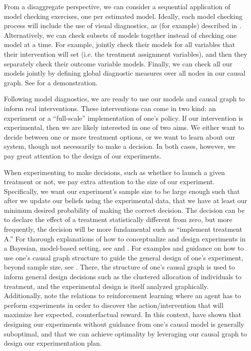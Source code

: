 From a disaggregate perspective, we can consider a sequential application of model checking exercises, one per estimated model.
Ideally, each model checking process will include the use of visual diagnostics, as (for example) described in \citet{brathwaite_2018_check}.
Alternatively, we can check subsets of models together instead of checking one model at a time.
For example, \citet{tran_2016_model} jointly check their models for all variables that their intervention will set (i.e. the treatment assignment variables), and then they separately check their outcome variable models.
Finally, we can check all our models jointly by defining global diagnostic measures over all nodes in our causal graph.
See \citet{williamson_2013_model} for a demonstration.

Following model diagnostics, we are ready to use our models and causal graph to inform real interventions.
These interventions can come in two kind: an experiment or a ``full-scale'' implementation of one's policy.
If our intervention is experimental, then we are likely interested in one of two aims.
We either want to decide between one or more treatment options, or we want to learn about our system, though not necessarily to make a decision.
In both cases, however, we pay great attention to the design of our experiments.

When experimenting to make decisions, such as whether to launch a given treatment or not, we pay extra attention to the size of our experiment.
Specifically, we want our experiment's sample size to be large enough such that after we update our beliefs using the experimental data, that we have at least our minimum desired probability of making the correct decision.
The decision can be to declare the effect of a treatment statistically different from zero, but more frequently, the decision will be more fundamental such as ``implement treatment A.''
For thorough explanations of how to conceptualize and design experiments in a Bayesian, model-based setting, see \citet{chaloner_1995_bayesian} and \citet{wang_2002_simulation}.
For examples and guidance on how to use one's causal graph structure to guide the general design of one's experiment, beyond sample size, see \citet{madrigal_2007_cluster}.
There, the structure of one's causal graph is used to inform general design decisions such as the clustered allocation of individuals to treatment, and the experimental design is itself analyzed graphically.
Additionally, note the relations to reinforcement learning where an agent has to perform experiments in order to discover the action/intervention that will maximize her expected, counterfactual reward.
In this context, \citet{lee_2018_structural} have shown that designing our experiments without guidance from one's causal model is generally suboptimal, and that we can achieve optimality by leveraging our causal graph to design our experimentation plan.

